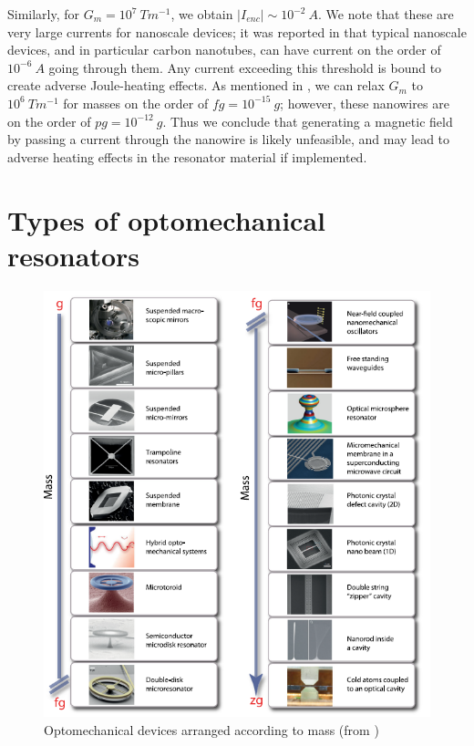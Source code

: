 \documentclass[%
 reprint,
nofootinbib,
 amsmath,amssymb,
 aps,
]{revtex4-2}
\begin{document}
Similarly, for $G_m = 10^7 \  Tm^{-1}$, we obtain $\big | I_{enc} \big | \sim 10^{-2}\ A$. We note that these are very large currents for nanoscale devices; it was reported in \cite{I_V_CNT} that typical nanoscale devices, and in particular carbon nanotubes, can have current on the order of $10^{-6}\ A$ going through them. Any current exceeding this threshold is bound to create adverse Joule-heating effects. As mentioned in \cite{project_paper}, we can relax $G_m$ to $10^6  \ Tm^{-1}$ for  masses on the order of $fg = 10^{-15} \ g$; however, these nanowires are on the order of $pg = 10^{-12}\ g$. Thus we conclude that generating a magnetic field by passing a current through the nanowire is likely unfeasible, and may lead to adverse heating effects in the resonator material if implemented. 

\section{Types of optomechanical resonators}\label{Types of optomechanical resonators}

\centering
\begin{center}
    \begin{figure}[htb]
    \centering
    \includegraphics[width = \columnwidth]{optomechanical_devices.PNG}
    \caption{Optomechanical devices arranged according to mass (from \cite{cavity_optomechanics_2014})}
    \label{fig:optomechanical_devices}
\end{figure}
\end{center}
\end{document}
